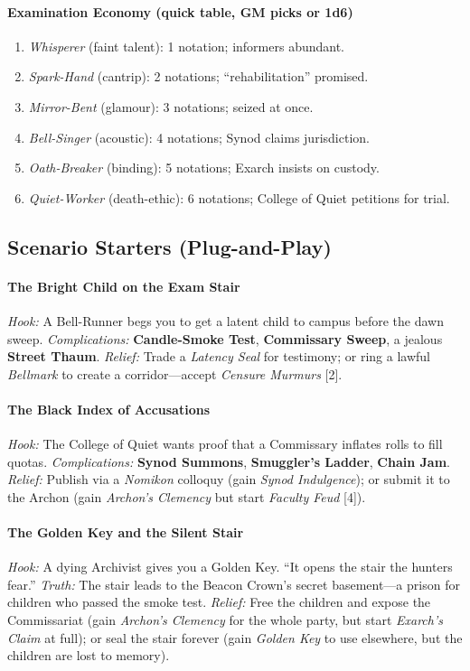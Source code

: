 \paragraph{Examination Economy (quick table, GM picks or 1d6)}
\begin{enumerate}
\item \emph{Whisperer} (faint talent): 1 notation; informers abundant.
\item \emph{Spark-Hand} (cantrip): 2 notations; ``rehabilitation'' promised.
\item \emph{Mirror-Bent} (glamour): 3 notations; seized at once.
\item \emph{Bell-Singer} (acoustic): 4 notations; Synod claims jurisdiction.
\item \emph{Oath-Breaker} (binding): 5 notations; Exarch insists on custody.
\item \emph{Quiet-Worker} (death-ethic): 6 notations; College of Quiet petitions for trial.
\end{enumerate}

\subsection*{Scenario Starters (Plug-and-Play)}
\paragraph{The Bright Child on the Exam Stair}
\emph{Hook:} A Bell-Runner begs you to get a latent child to campus before the dawn sweep.  
\emph{Complications:} \textbf{Candle-Smoke Test}, \textbf{Commissary Sweep}, a jealous \textbf{Street Thaum}.  
\emph{Relief:} Trade a \emph{Latency Seal} for testimony; or ring a lawful \emph{Bellmark} to create a corridor---accept \emph{Censure Murmurs} [2].

\paragraph{The Black Index of Accusations}
\emph{Hook:} The College of Quiet wants proof that a Commissary inflates rolls to fill quotas.  
\emph{Complications:} \textbf{Synod Summons}, \textbf{Smuggler's Ladder}, \textbf{Chain Jam}.  
\emph{Relief:} Publish via a \emph{Nomikon} colloquy (gain \emph{Synod Indulgence}); or submit it to the Archon (gain \emph{Archon's Clemency} but start \emph{Faculty Feud} [4]).

\paragraph{The Golden Key and the Silent Stair}
\emph{Hook:} A dying Archivist gives you a Golden Key. ``It opens the stair the hunters fear.''  
\emph{Truth:} The stair leads to the Beacon Crown's secret basement---a prison for children who passed the smoke test.  
\emph{Relief:} Free the children and expose the Commissariat (gain \emph{Archon's Clemency} for the whole party, but start \emph{Exarch's Claim} at full); or seal the stair forever (gain \emph{Golden Key} to use elsewhere, but the children are lost to memory).

